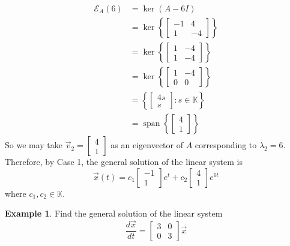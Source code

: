 \documentclass[11pt]{book}
\theoremstyle{definition}\newtheorem{definition}[subsection]{Definition}
\theoremstyle{definition}\newtheorem{example}[subsection]{Example}
\theoremstyle{definition}\newtheorem{notation}[subsection]{Notation}
\theoremstyle{definition}\newtheorem{remark}[subsection]{Remark}
\theoremstyle{theorem}\newtheorem{theorem}[subsection]{Theorem}
\theoremstyle{theorem}\newtheorem{lemma}[subsection]{Lemma}
\theoremstyle{theorem}\newtheorem{proposition}[subsection]{Proposition}
\theoremstyle{theorem}\newtheorem{corollary}[subsection]{Corollary}
\theoremstyle{theorem}\newtheorem{case}{Case}
\theoremstyle{remark}\newtheorem{subcase}{Subcase}[case]
\newcommand{\K}{\mathbb{K}}
\newcommand{\E}{\mathcal{E}}
\DeclareMathOperator{\Span}{span}
\begin{document}
\begin{align*}
    \E_A(6) &= \ker(A - 6I) \\
    &= \ker\left\{\begin{bmatrix} -1 & 4 \\ 1 & -4 \end{bmatrix}\right\} \\
    &= \ker\left\{\begin{bmatrix} 1 & -4 \\ 1 & -4 \end{bmatrix}\right\} \\
    &= \ker\left\{\begin{bmatrix} 1 & -4 \\ 0 & 0 \end{bmatrix}\right\} \\
    &= \left\{\begin{bmatrix} 4s \\ s \end{bmatrix} : s \in \K\right\} \\
    &= \Span\left\{\begin{bmatrix} 4 \\ 1 \end{bmatrix}\right\}
\end{align*}
So we may take $\vec{v}_2 = \begin{bmatrix} 4 \\ 1 \end{bmatrix}$ as an eigenvector of $A$ corresponding to $\lambda_2 = 6$. Therefore, by Case 1, the general solution of the linear system is
\begin{equation*}
    \vec{x}(t) = c_1\begin{bmatrix} -1 \\ 1 \end{bmatrix}e^{t} + c_2\begin{bmatrix} 4 \\ 1 \end{bmatrix} e^{6t}
\end{equation*}
where $c_1, c_2 \in \K$.

\begin{example}\label{example:1.2.4}
    Find the general solution of the linear system
    \begin{equation*}
        \frac{d\vec{x}}{dt} = \begin{bmatrix} 3 & 0 \\ 0 & 3 \end{bmatrix} \vec{x}
    \end{equation*}
\end{example}
\end{document}
